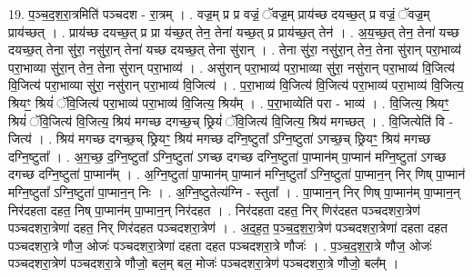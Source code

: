 \documentclass[17pt]{extarticle}
\begin{document}
19. प॒ञ्च॒द॒श॒रा॒त्रमिति॑ पञ्चदश - रा॒त्रम् । . वज्र॒म् प्र प्र वज्रं॒ ॅवज्र॒म् प्राय॑च्छ दयच्छ॒त् प्र वज्रं॒ ॅवज्र॒म् प्राय॑च्छत् । . प्राय॑च्छ दयच्छ॒त् प्र प्रा य॑च्छ॒त् तेन॒ तेना॑ यच्छ॒त् प्र प्राय॑च्छ॒त् तेन॑ । . अ॒य॒च्छ॒त् तेन॒ तेना॑ यच्छ दयच्छ॒त् तेना सु॑रा॒ नसु॑रा॒न् तेना॑ यच्छ दयच्छ॒त् तेना सु॑रान् । . तेना सु॑रा॒ नसु॑रा॒न् तेन॒ तेना सु॑रान् परा॒भाव्य॑ परा॒भाव्या सु॑रा॒न् तेन॒ तेना सु॑रान् परा॒भाव्य॑ । . असु॑रान् परा॒भाव्य॑ परा॒भाव्या सु॑रा॒ नसु॑रान् परा॒भाव्य॑ वि॒जित्य॑ वि॒जित्य॑ परा॒भाव्या सु॑रा॒ नसु॑रान् परा॒भाव्य॑ वि॒जित्य॑ । . प॒रा॒भाव्य॑ वि॒जित्य॑ वि॒जित्य॑ परा॒भाव्य॑ परा॒भाव्य॑ वि॒जित्य॒ श्रियꣳ॒॒ श्रियं॑ ॅवि॒जित्य॑ परा॒भाव्य॑ परा॒भाव्य॑ वि॒जित्य॒ श्रिय᳚म् । . प॒रा॒भाव्येति॑ परा - भाव्य॑ । . वि॒जित्य॒ श्रियꣳ॒॒ श्रियं॑ ॅवि॒जित्य॑ वि॒जित्य॒ श्रिय॑ मगच्छ दगच्छ॒च् छ्रियं॑ ॅवि॒जित्य॑ वि॒जित्य॒ श्रिय॑ मगच्छत् । . वि॒जित्येति॑ वि - जित्य॑ । . श्रिय॑ मगच्छ दगच्छ॒च् छ्रियꣳ॒॒ श्रिय॑ मगच्छ दग्नि॒ष्टुता᳚ ऽग्नि॒ष्टुता॑ ऽगच्छ॒च् छ्रियꣳ॒॒ श्रिय॑ मगच्छ दग्नि॒ष्टुता᳚ । . अ॒ग॒च्छ॒ द॒ग्नि॒ष्टुता᳚ ऽग्नि॒ष्टुता॑ ऽगच्छ दगच्छ दग्नि॒ष्टुता॑ पा॒प्मान॑म् पा॒प्मान॑ मग्नि॒ष्टुता॑ ऽगच्छ दगच्छ दग्नि॒ष्टुता॑ पा॒प्मान᳚म् । . अ॒ग्नि॒ष्टुता॑ पा॒प्मान॑म् पा॒प्मान॑ मग्नि॒ष्टुता᳚ ऽग्नि॒ष्टुता॑ पा॒प्मान॒न् निर् णिष् पा॒प्मान॑ मग्नि॒ष्टुता᳚ ऽग्नि॒ष्टुता॑ पा॒प्मान॒न् निः । . अ॒ग्नि॒ष्टुतेत्य॑ग्नि - स्तुता᳚ । . पा॒प्मान॒न् निर् णिष् पा॒प्मान॑म् पा॒प्मान॒न् निर॑दहता दहत॒ निष् पा॒प्मान॑म् पा॒प्मान॒न् निर॑दहत । . निर॑दहता दहत॒ निर् णिर॑दहत पञ्चदशरा॒त्रेण॑ पञ्चदशरा॒त्रेणा॑ दहत॒ निर् णिर॑दहत पञ्चदशरा॒त्रेण॑ । . अ॒द॒ह॒त॒ प॒ञ्च॒द॒श॒रा॒त्रेण॑ पञ्चदशरा॒त्रेणा॑ दहता दहत पञ्चदशरा॒त्रे णौज॒ ओजः॑ पञ्चदशरा॒त्रेणा॑ दहता दहत पञ्चदशरा॒त्रे णौजः॑ । . प॒ञ्च॒द॒श॒रा॒त्रे णौज॒ ओजः॑ पञ्चदशरा॒त्रेण॑ पञ्चदशरा॒त्रे णौजो॒ बल॒म् बल॒ मोजः॑ पञ्चदशरा॒त्रेण॑ पञ्चदशरा॒त्रे णौजो॒ बल᳚म् । \newline
\end{document}
